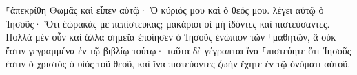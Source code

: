 \documentclass{openreader}
\begin{document}
⸀ἀπεκρίθη Θωμᾶς καὶ εἶπεν αὐτῷ· Ὁ κύριός μου καὶ ὁ θεός μου. 
λέγει αὐτῷ ὁ Ἰησοῦς· Ὅτι ἑώρακάς με πεπίστευκας; μακάριοι οἱ μὴ ἰδόντες καὶ πιστεύσαντες. 
Πολλὰ μὲν οὖν καὶ ἄλλα σημεῖα ἐποίησεν ὁ Ἰησοῦς ἐνώπιον τῶν ⸀μαθητῶν, ἃ οὐκ ἔστιν γεγραμμένα ἐν τῷ βιβλίῳ τούτῳ· 
ταῦτα δὲ γέγραπται ἵνα ⸀πιστεύητε ὅτι Ἰησοῦς ἐστιν ὁ χριστὸς ὁ υἱὸς τοῦ θεοῦ, καὶ ἵνα πιστεύοντες ζωὴν ἔχητε ἐν τῷ ὀνόματι αὐτοῦ. 
\end{document}
